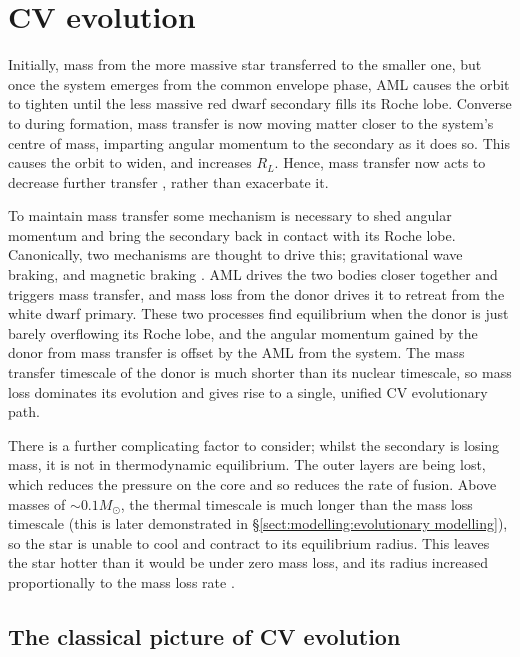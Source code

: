 \section{CV evolution}
\label{sect:introduction:Summary of how AML and Mdot drive period evolution}

Initially, mass from the more massive star transferred to the smaller one, but once the system emerges from the common envelope phase, AML causes the orbit to tighten until the less massive red dwarf secondary fills its Roche lobe. Converse to during formation, mass transfer is now moving matter closer to the system's centre of mass, imparting angular momentum to the secondary as it does so. This causes the orbit to widen, and increases $R_L$. Hence, mass transfer now acts to decrease further transfer \citep{Ritter2008}, rather than exacerbate it.

To maintain mass transfer some mechanism is necessary to shed angular momentum and bring the secondary back in contact with its Roche lobe.
Canonically, two mechanisms are thought to drive this; gravitational wave braking, and magnetic braking \citep{knigge2006,knigge11}.
AML drives the two bodies closer together and triggers mass transfer, and mass loss from the donor drives it to retreat from the white dwarf primary. These two processes find equilibrium when the donor is just barely overflowing its Roche lobe, and the angular momentum gained by the donor from mass transfer is offset by the AML from the system.
The mass transfer timescale of the donor is much shorter than its nuclear timescale, so mass loss dominates its evolution and gives rise to a single, unified CV evolutionary path.

There is a further complicating factor to consider; whilst the secondary is losing mass, it is not in thermodynamic equilibrium. The outer layers are being lost, which reduces the pressure on the core and so reduces the rate of fusion.
Above masses of $\sim 0.1 M_\odot$, the thermal timescale is much longer than the mass loss timescale (this is later demonstrated in \S\ref{sect:modelling:evolutionary modelling}), so the star is unable to cool and contract to its equilibrium radius. This leaves the star hotter than it would be under zero mass loss, and its radius increased proportionally to the mass loss rate \citep{knigge2006, knigge11}.


\subsection{The classical picture of CV evolution}
\label{sect:introduction:AMLMechs}

